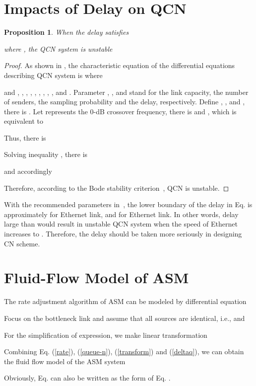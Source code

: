 \documentclass{sig-alternate-10pt}
\begin{document}

  



\appendix
\section{Impacts of Delay on QCN}
\newtheorem{theorem}{Proposition}
\begin{theorem}
When the delay  satisfies 

where , 
the QCN system is unstable
\label{Proposition1}
\end{theorem}
\begin{proof}
As shown in , the characteristic equation of the differential equations describing QCN system is  where

and , , , , , , , , ,  and . Parameter , ,  and  stand for the link capacity, the number of senders, the sampling probability and the delay, respectively. Define , , and , there is . Let  represents the 0-dB crossover frequency, there is  and , which is equivalent to 

Thus, there is

Solving inequality , there is

and accordingly 

Therefore, according to the Bode stability criterion~\cite{stability}, QCN is unstable.
\end{proof}
With the recommended parameters in~\cite{average}, the lower boundary of the delay in Eq.  is approximately  for  Ethernet link, and  for  Ethernet link. In other words, delay large than  would result in unstable QCN system when the speed of Ethernet increases to . Therefore, the delay should be taken more seriously in designing CN scheme.



\section{Fluid-Flow Model of ASM}
The rate adjustment algorithm  of ASM can be modeled by differential equation

Focus on the bottleneck link and assume that all  sources are identical, i.e.,  and

For the simplification of expression, we make linear transformation

Combining Eq. (\ref{rate}), (\ref{queue-n}), (\ref{transform}) and (\ref{deltaq}), we can obtain the fluid flow model of the ASM system 

Obviously, Eq.  can also be written as the form of Eq. .
\end{document}
